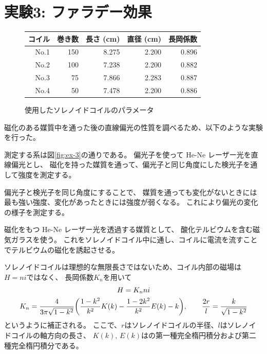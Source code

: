 \documentclass[9pt,dvipdfmx,a4paper]{jsarticle}
\begin{document}
\section{実験3: ファラデー効果}
\begin{figure}
    \centering
    \caption{使用したソレノイドコイルのパラメータ}
    \label{table:ex-3}
    \begin{tabular}{rrrrr}
        \hline
        コイル & 巻き数 & 長さ (cm) & 直径 (cm) & 長岡係数\\
        \hline
        No.1 & 150 & 8.275 & 2.200 & 0.896\\
        No.2 & 100 & 7.238 & 2.200 & 0.882\\
        No.3 & 75 & 7.866 & 2.283 & 0.887\\
        No.4 & 50 & 7.478 & 2.200 & 0.886\\
        \hline
    \end{tabular}
\end{figure}

磁化のある媒質中を通った後の直線偏光の性質を調べるため、以下のような実験を行った。

測定する系は図\ref{fig:ex-3}の通りである。
偏光子を使って He-Ne レーザー光を直線偏光とし、
磁化を持った媒質を通って、偏光子と同じ角度にした検光子を通して強度を測定する。

偏光子と検光子を同じ角度にすることで、
媒質を通っても変化がないときには最も強い強度、変化があったときには強度が弱くなる。
これにより偏光の変化の様子を測定する。

磁化をもつ He-Ne レーザー光を透過する媒質として、
酸化テルビウムを含む磁気ガラスを使う。
これをソレノイドコイル中に通し、コイルに電流を流すことでテルビウムの磁化を誘起させる。

ソレノイドコイルは理想的な無限長さではないため、コイル内部の磁場は\(H=ni\)ではなく、
長岡係数\(K_n\)を用いて
\begin{gather}
    H = K_n n i\\
    K_n = \frac{4}{3\pi\sqrt{1-k^2}}\qty(\frac{1-k^2}{k^2}K(k)-\frac{1-2k^2}{k^2}E(k)-k),\qquad
    \frac{2r}{l} = \frac{k}{\sqrt{1-k^2}}
\end{gather}
というように補正される。
ここで、\(r\)はソレノイドコイルの半径、\(l\)はソレノイドコイルの軸方向の長さ、
\(K(k),\,E(k)\)はの第一種完全楕円積分および第二種完全楕円積分である。
\end{document}
